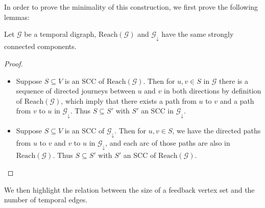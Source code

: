 \documentclass[11pt]{article}%
\begin{document}
  In order to prove the minimality of this construction, we first prove the following lemmas:
  \begin{lemma}
  \label{lemma:sccfootprintreach}
    Let $\mathcal{G}$ be a temporal digraph, $\mathrm{Reach}(\mathcal G)$ and $\mathcal G_{\downarrow}$ have the same strongly connected components.
  \end{lemma}
  \begin{proof}
    \begin{itemize}
      \item Suppose $S \subseteq V$ is an SCC of $\mathrm{Reach}(\mathcal G)$. Then for $u,v \in S$ in $\mathcal G$ there is a sequence of directed journeys between $u$ and $v$ in both directions by definition of $\mathrm{Reach}(\mathcal G)$, which imply that there exists a path from $u$ to $v$ and a path from $v$ to $u$ in $\mathcal G_{\downarrow}$. Thus $S \subseteq S'$ with $S'$ an SCC in $\mathcal G_{\downarrow}$.
      \item Suppose $S \subseteq V$ is an SCC of $\mathcal G_{\downarrow}$. Then for $u,v \in S$, we have the directed paths from $u$ to $v$ and $v$ to $u$ in $\mathcal G_{\downarrow}$, and each arc of those paths are also in $\mathrm{Reach}(\mathcal G)$. Thus $S \subseteq S'$ with $S'$ an SCC of $\mathrm{Reach}(\mathcal G)$.\qedhere
    \end{itemize}
  \end{proof}
  
  We then highlight the relation between the size of a feedback vertex set and the number of temporal edges.
  
\end{document}
